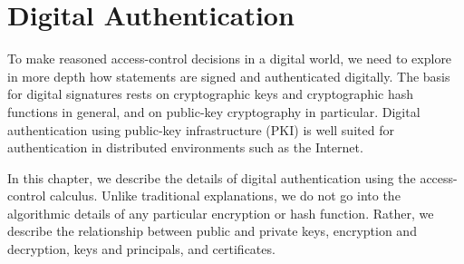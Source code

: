 \chapter{Digital Authentication}
\label{cha:pki}




To make reasoned access-control decisions in a digital world, we need
to explore in more depth how statements are signed and authenticated
digitally.  The basis for digital signatures rests on cryptographic
keys and cryptographic hash functions in general, and on public-key
cryptography in particular. Digital authentication using
public-key infrastructure
(PKI) is well suited for authentication in distributed environments
such as the Internet.

In this chapter, we describe the details of digital authentication using
the access-control calculus.  Unlike traditional explanations, we do not
go into the algorithmic details of any particular encryption or hash
function. Rather, we describe the relationship between public and
private keys, encryption and decryption, keys and principals, and
certificates.



